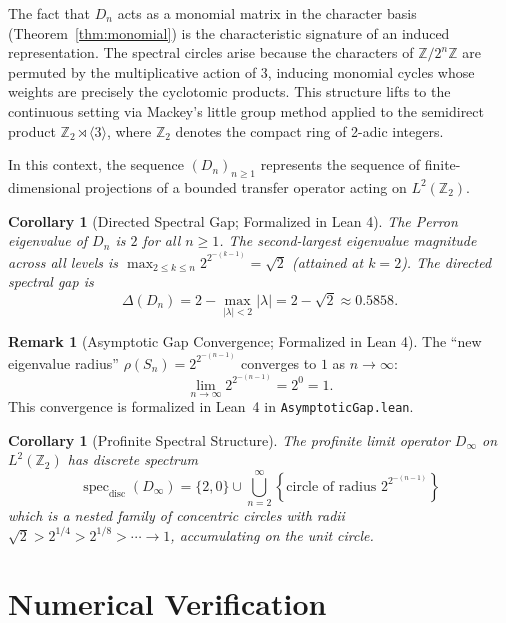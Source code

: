 \documentclass[11pt,reqno]{amsart}
\newtheorem{corollary}[theorem]{Corollary}
\theoremstyle{definition}
\newtheorem{remark}[theorem]{Remark}
\begin{document}
The fact that $D_n$ acts as a monomial matrix in the character basis (Theorem~\ref{thm:monomial}) is the characteristic signature of an induced representation. The spectral circles arise because the characters of $\mathbb{Z}/2^n\mathbb{Z}$ are permuted by the multiplicative action of $3$, inducing monomial cycles whose weights are precisely the cyclotomic products. This structure lifts to the continuous setting via Mackey's little group method applied to the semidirect product $\mathbb{Z}_2 \rtimes \langle 3 \rangle$, where $\mathbb{Z}_2$ denotes the compact ring of 2-adic integers.

In this context, the sequence $(D_n)_{n \ge 1}$ represents the sequence of finite-dimensional projections of a bounded transfer operator acting on $L^2(\mathbb{Z}_2)$.

\begin{corollary}[Directed Spectral Gap; Formalized in Lean 4]
The Perron eigenvalue of $D_n$ is $2$ for all $n \ge 1$. The second-largest eigenvalue magnitude across all levels is $\max_{2 \le k \le n} 2^{2^{-(k-1)}} = \sqrt{2}$ (attained at $k = 2$). The directed spectral gap is
\[
\Delta(D_n) = 2 - \max_{|\lambda| < 2} |\lambda| = 2 - \sqrt{2} \approx 0.5858.
\]
\end{corollary}

\begin{remark}[Asymptotic Gap Convergence; Formalized in Lean 4]
The ``new eigenvalue radius'' $\rho(S_n) = 2^{2^{-(n-1)}}$ converges to $1$ as $n \to \infty$:
\[
\lim_{n \to \infty} 2^{2^{-(n-1)}} = 2^0 = 1.
\]
This convergence is formalized in Lean~4 in \texttt{AsymptoticGap.lean}.
\end{remark}

\begin{corollary}[Profinite Spectral Structure]
The profinite limit operator $D_\infty$ on $L^2(\mathbb{Z}_2)$ has discrete spectrum
\[
\operatorname{spec}_{\mathrm{disc}}(D_\infty) = \{2, 0\} \cup \bigcup_{n=2}^{\infty} \left\{ \text{circle of radius } 2^{2^{-(n-1)}} \right\}
\]
which is a nested family of concentric circles with radii $\sqrt{2} > 2^{1/4} > 2^{1/8} > \cdots \to 1$, accumulating on the unit circle.
\end{corollary}

\section{Numerical Verification}
\end{document}
